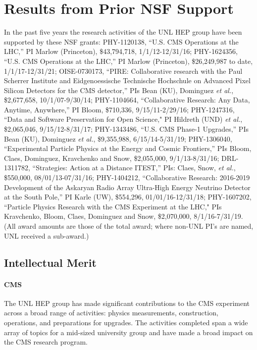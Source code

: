 \section{Results from Prior NSF Support}
\label{sec:prior}

In the past five years the research activities of the UNL HEP group have been supported by these NSF grants: 
PHY-1120138, ``U.S. CMS Operations at the LHC,'' PI Marlow (Princeton), \$43,794,718, 1/1/12-12/31/16; 
PHY-1624356, ``U.S. CMS Operations at the LHC,'' PI Marlow (Princeton), \$26,249,987 to date, 1/1/17-12/31/21; 
OISE-0730173, ``PIRE: Collaborative research with the Paul Scherrer Institute and Eidgenoessische Technische Hochschule on Advanced Pixel Silicon Detectors for the CMS detector,'' PIs Bean (KU), Dominguez {\it et al.}, \$2,677,658, 10/1/07-9/30/14; 
PHY-1104664, ``Collaborative Research: Any Data, Anytime, Anywhere,'' PI Bloom, \$710,336, 9/15/11-2/29/16;
PHY-1247316, ``Data and Software Preservation for Open Science," PI Hildreth (UND) {\it et al.}, \$2,065,046, 9/15/12-8/31/17;
PHY-1343486, ``U.S. CMS Phase-1 Upgrades,'' PIs Bean (KU), Dominguez {\it et al.}, \$9,355,988, 6/15/14-5/31/19;
PHY-1306040, ``Experimental Particle Physics at the Energy and Cosmic Frontiers,'' PIs Bloom, Claes, Dominguez, Kravchenko and Snow, \$2,055,000, 9/1/13-8/31/16;
DRL-1311782, ``Strategies: Action at a Distance ITEST,'' PIs: Claes, Snow, {\it et al.}, \$550,000, 08/01/13-07/31/16;
PHY-1404212, ``Collaborative Research: 2016-2019 Development of the Askaryan Radio Array Ultra-High Energy Neutrino Detector at the South Pole,'' PI Karle (UW), \$554,296, 01/01/16-12/31/18;
PHY-1607202, ``Particle Physics Research with the CMS Experiment at the LHC," PIs Kravchenko, Bloom, Claes, Dominguez and Snow, \$2,070,000, 8/1/16-7/31/19.
(All award amounts are those of the total award; where non-UNL PI's are named, UNL received a sub-award.)


\subsection{Intellectual Merit}

\paragraph{CMS}
The UNL HEP group has made significant contributions to the CMS experiment across a broad range of activities: physics measurements, construction, operations, and preparations for upgrades. The activities completed span a wide array of topics for a mid-sized university group and have made a broad impact on the CMS research program.

